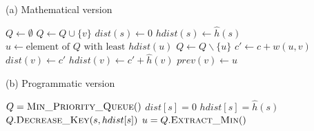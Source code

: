 \begin{center}
    \begin{algorithm}[H]
        \caption{A* algorithm}
        \label{alg-astar}
        \begin{minipage}[t]{0.49\linewidth}
            (a) Mathematical version
            \begin{algorithmic}[1]
                    \State $Q \gets \emptyset$
                        \State $Q \gets Q \cup \{v\}$
                    \EndFor
                    \State $dist(s) \gets 0$
                    \State $hdist(s) \gets \hat{h}(s)$
                        \State $u \gets \text{element of } Q \text{ with least } hdist(u)$
                          \EndIf
                        \State $Q \gets Q \backslash \{u\}$
                            \State $c' \gets c + w(u, v)$
                                \State $dist(v) \gets c'$
                                \State $hdist(v) \gets c'+\hat{h}(v)$
                                \State $prev(v) \gets u$
                            \EndIf
                        \EndFor
                    \EndWhile
                \EndFunction
            \end{algorithmic}
        \end{minipage}
        \begin{minipage}[t]{0.49\linewidth}
            (b) Programmatic version
            \begin{algorithmic}[1]
                    \State $Q = \Call{Min\_Priority\_Queue}{ }$
                    \EndFor
                    \State $dist[s] = 0$
                    \State $hdist[s] = \hat{h}(s)$
                    \State $Q.\Call{Decrease\_Key}{s, hdist[s]}$
                        \State $u = Q.\Call{Extract\_Min}{ }$

\end{algorithmic}
\end{minipage}
\end{algorithm}
\end{center}
